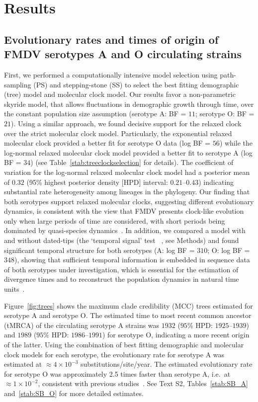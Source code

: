 \documentclass[10pt]{article}
\begin{document}
\section*{Results}

\subsection*{Evolutionary rates and times of origin of FMDV serotypes A and O circulating strains}

First, we performed a computationally intensive model selection using path-sampling (PS) and stepping-stone (SS) to select the best fitting demographic (tree) model and molecular clock model.
Our results favor a non-parametric skyride model, that allows fluctuations in demographic growth through time, over the constant population size assumption (serotype A: BF = $11$; serotype O: BF = $21$).
Using a similar approach, we  found decisive support for the relaxed clock over the strict molecular clock model.
Particularly, the exponential relaxed molecular clock provided a better fit for serotype O data (log BF = $56$) while the log-normal relaxed molecular clock model provided a better fit to serotype A (log BF = $34$) (see Table~\ref{stab:treeclockselection} for details). 
The coefficient of variation for the log-normal relaxed molecular clock model had a posterior mean of $0.32$ (95\% highest posterior density [HPD] interval: $0.21$--$0.43$) indicating substantial rate heterogeneity among lineages in the phylogeny.
Our finding that both serotypes support relaxed molecular clocks, suggesting different evolutionary dynamics, is consistent with the view that FMDV presents clock-like evolution only when large periods of time are considered, with short periods being dominated by quasi-species dynamics~\cite{Muellner2011}.  
In addition, we compared a model with and without dated-tips (the `temporal signal' test~\cite{Faria2012} , see Methods) and found significant temporal structure for both serotypes (A: log BF = $310$; O: log BF = $348$), showing that sufficient temporal information is embedded in sequence data of both serotypes under investigation, which is essential for the estimation of divergence times and to reconstruct the population dynamics in natural time units~\cite{MEP}. 

Figure~\ref{fig:trees} shows the maximum clade credibility (MCC) trees estimated for serotype A and serotype O.
The estimated time to most recent common ancestor (tMRCA) of the circulating serotype A strains was $1932$ ($95\%$ HPD: $1925$--$1939$) and  $1989$ ($95\%$ HPD: $ 1986$--$1991$) for serotype O, indicating a more recent origin of the latter. 
Using the combination of best fitting demographic and molecular clock models for each serotype, the evolutionary rate for serotype A was estimated at $\approx 4 \times 10^{-3}$ substitutions/site/year.
The estimated evolutionary rate for serotype O was approximately 2.5 times faster than serotype A, i.e.~at $\approx 1 \times 10^{-2}$, consistent with previous studies~\cite{tully, Carvalho2013, Muellner2011}.
See Text S2, Tables~\ref{stab:SB_A} and~\ref{stab:SB_O} for more detailed estimates.
\end{document}
